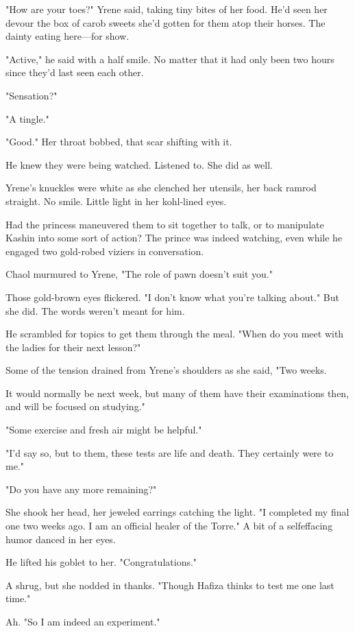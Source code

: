 "How are your toes?" Yrene said, taking tiny bites of her food. He'd seen her devour the box of carob sweets she'd gotten for them atop their horses. The dainty eating here---for show.

"Active," he said with a half smile. No matter that it had only been two hours since they'd last seen each other.

"Sensation?"

"A tingle."

"Good." Her throat bobbed, that scar shifting with it.

He knew they were being watched. Listened to. She did as well.

Yrene's knuckles were white as she clenched her utensils, her back ramrod straight. No smile. Little light in her kohl-lined eyes.

Had the princess maneuvered them to sit together to talk, or to manipulate Kashin into some sort of action? The prince was indeed watching, even while he engaged two gold-robed viziers in conversation.

Chaol murmured to Yrene, "The role of pawn doesn't suit you."

Those gold-brown eyes flickered. "I don't know what you're talking about." But she did. The words weren't meant for him.

He scrambled for topics to get them through the meal. "When do you meet with the ladies for their next lesson?"

Some of the tension drained from Yrene's shoulders as she said, "Two weeks.

It would normally be next week, but many of them have their examinations then, and will be focused on studying."

"Some exercise and fresh air might be helpful."

"I'd say so, but to them, these tests are life and death. They certainly were to me."

"Do you have any more remaining?"

She shook her head, her jeweled earrings catching the light. "I completed my final one two weeks ago. I am an official healer of the Torre." A bit of a selfeffacing humor danced in her eyes.

He lifted his goblet to her. "Congratulations."

A shrug, but she nodded in thanks. "Though Hafiza thinks to test me one last time."

Ah. "So I am indeed an experiment."

